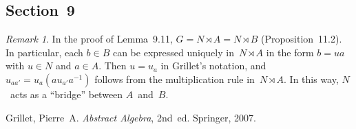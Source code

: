 \documentclass[letterpaper,12pt]{article}
\newcommand{\lsemidirect}{\rtimes}
\theoremstyle{definition}
\theoremstyle{remark}
\newtheorem*{rmk}{Remark}
\theoremstyle{plain}
\begin{document}
\subsection*{Section~9}
\begin{rmk}
In the proof of Lemma~9.11, \(G=N\lsemidirect A=N\lsemidirect B\) (Proposition~11.2). In particular, each \(b\in B\) can be expressed uniquely in~\(N\lsemidirect A\) in the form \(b=ua\) with \(u\in N\) and \(a\in A\). Then \(u=u_a\) in Grillet's notation, and \(u_{aa'}=u_a(au_{a'}a^{-1})\) follows from the multiplication rule in~\(N\lsemidirect A\). In this way, \(N\)~acts as a ``bridge'' between \(A\)~and~\(B\).
\end{rmk}

\begin{thebibliography}{0}
 Grillet, Pierre~A. \textit{Abstract Algebra}, 2nd~ed. Springer, 2007.
\end{thebibliography}
\end{document}
